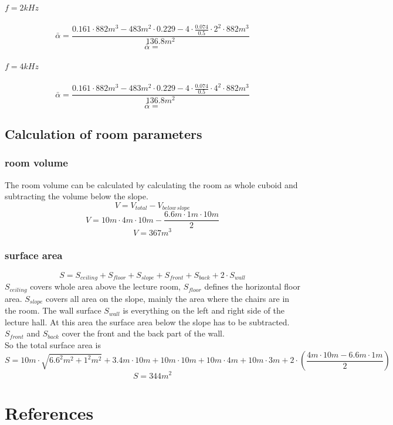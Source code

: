 \documentclass{article}
\begin{document}
\paragraph{$f=2kHz$}
$$\bar{\alpha}=\frac{0.161\cdot 882m^3-483m^2\cdot 0.229-4\cdot \frac{0.074}{0.5}\cdot 2^2\cdot 882m^3}{136.8m^2}$$
$$\bar{\alpha}=$$
\paragraph{$f=4kHz$}
$$\bar{\alpha}=\frac{0.161\cdot 882m^3-483m^2\cdot 0.229-4\cdot \frac{0.074}{0.5}\cdot 4^2\cdot 882m^3}{136.8m^2}$$
$$\bar{\alpha}=$$
\subsection{Calculation of room parameters\label{sec:roomparam}}
\subsubsection{room volume}
The room volume can be calculated by calculating the room as whole cuboid and subtracting the volume below the slope.
\begin{equation}
V=V_{total}-V_{below\,slope}
\end{equation}
$$V=10m\cdot 4m\cdot 10m-\frac{6.6m\cdot 1m\cdot 10m}{2}$$
$$V=367m^3$$
\subsubsection{surface area}
\begin{equation}
S=S_{ceiling}+S_{floor}+S_{slope}+S_{front}+S_{back}+2\cdot S_{wall}
\end{equation}
$S_{ceiling}$ covers whole area above the lecture room, $S_{floor}$ defines the horizontal floor area. $S_{slope}$ covers all area on the slope, mainly the area where the chairs are in the room. The wall surface $S_{wall}$ is everything on the left and right side of the lecture hall. At this area the surface area below the slope has to be subtracted. $S_{front}$ and $S_{back}$ cover the front and the back part of the wall.\\
So the total surface area is
$$S=10m\cdot\sqrt{6.6^2m^2+1^2m^2}+3.4m\cdot 10m+10m\cdot 10m+10m\cdot 4m+10m\cdot 3m+2\cdot(\frac{4m\cdot 10m-6.6m\cdot 1m}{2})$$
$$S=344m^2$$
\newpage
\section{References}
\end{document}
